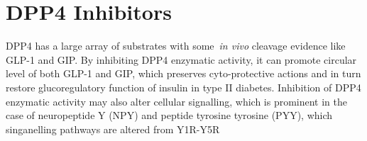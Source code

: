\section{DPP4 Inhibitors}
DPP4 has a large array of substrates with some~\textit{in vivo} cleavage evidence like GLP-1 and GIP. By inhibiting DPP4 enzymatic activity, it can promote circular level of both GLP-1 and GIP, which preserves cyto-protective actions and in turn restore glucoregulatory function of insulin in type II diabetes. Inhibition of DPP4 enzymatic activity may also alter cellular signalling, which is prominent in the case of neuropeptide Y (NPY) and peptide tyrosine tyrosine (PYY), which singanelling pathways are altered from Y1R-Y5R